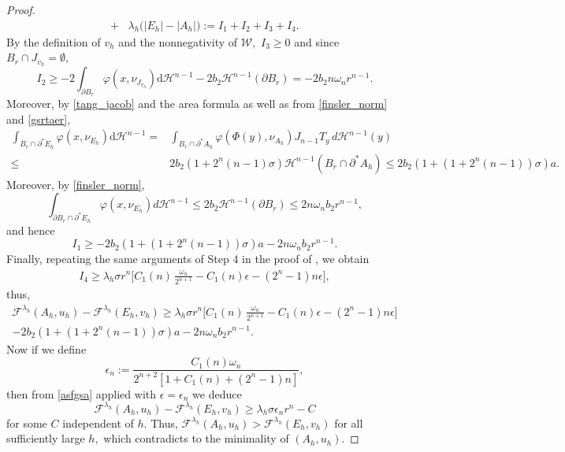 \documentclass[reqno]{amsart}
\numberwithin{equation}{section}
\theoremstyle{plain}
\theoremstyle{definition}
\newcommand{\cH}{\mathcal{H}}
\newcommand{\cF}{\mathcal{F}}
\newcommand{\cW}{\mathcal{W}}
\newcommand{\p}{\partial}
\newcommand{\bound}{b}
\renewcommand{\d}{\mathrm{d}}
\begin{document}
\begin{proof}
\begin{align}
+ & \lambda_h \Big(|E_h| - |A_h|\Big)
:= I_1 + I_2 + I_3+I_4. \label{saisnainsa}
\end{align}
By the definition of $v_h$ and the nonnegativity of $\cW,$ $I_3\ge0$  and since $B_r\cap J_{v_h}=\emptyset,$
$$
I_2\ge - 2\int_{\p B_r} \varphi(x,\nu_{J_{v_h}})\d\cH^{n-1} -2\bound_2\cH^{n-1}(\p B_r) = -2\bound_2 n\omega_n r^{n-1}.
$$
Moreover, by \eqref{tang_jacob} and the area formula as well as from \eqref{finsler_norm} and \eqref{gsrtaer},
%
\begin{align*}
\int_{B_r\cap \p^* E_h} \varphi(x,\nu_{E_h})\d\cH^{n-1} = &
\int_{B_r\cap \p^* A_h}  \varphi(\Phi(y),\nu_{A_h})J_{n-1} T_y\,d\cH^{n-1}(y)\\
\le & 2\bound_2(1+2^n(n-1)\sigma) \cH^{n-1}(B_r\cap \p^* A_h) 
  \le 2\bound_2(1+(1+2^n(n-1))\sigma)a.
\end{align*}
Moreover, by \eqref{finsler_norm},
$$
\int_{\p B_r\cap \p^* E_h} \varphi(x,\nu_{E_h})d\cH^{n-1} \le 2\bound_2\cH^{n-1}(\p B_r) \le 2n\omega_n \bound_2r^{n-1},
$$
and hence
$$
I_1\ge - 2\bound_2(1+(1+2^n(n-1))\sigma)a - 2n\omega_n \bound_2r^{n-1}.
$$
Finally, repeating the same arguments of Step 4  in the proof of \cite[Theorem 1.1]{EF:2011}, we obtain
\begin{align*}
I_4 \ge \lambda_h \sigma r^n \Big[C_1(n)\,\frac{\omega_n}{2^{n+1}} - C_1(n)\epsilon - (2^n-1)n\epsilon\Big],
\end{align*}
thus, 
\begin{multline}
\cF^{\lambda_h}(A_h,u_h) -  \cF^{\lambda_h}(E_h,v_h) \ge   \lambda_h \sigma r^n \Big[C_1(n)\,\frac{\omega_n}{2^{n+1}} - C_1(n)\epsilon - (2^n-1)n\epsilon\Big] \\
-  2\bound_2(1+(1+2^n(n-1))\sigma)a - 2n\omega_n \bound_2r^{n-1}.  \label{asfgsa}
\end{multline}
%
Now if we define 
$$
\epsilon_n:=\frac{C_1(n)\omega_n}{2^{n+2} [1+C_1(n) + (2^n-1)n]},
$$
then from \eqref{asfgsa} applied with $\epsilon=\epsilon_n$ we deduce 
\begin{equation*}
\cF^{\lambda_h}(A_h,u_h) -  \cF^{\lambda_h}(E_h,v_h) \ge \lambda_h \sigma \epsilon_n r^n - C  
\end{equation*}
for some $C$ independent of $h.$ Thus, $\cF^{\lambda_h}(A_h,u_h) >\cF^{\lambda_h}(E_h,v_h)$  for all sufficiently large $h,$   which contradicts to the minimality of $(A_h,u_h).$
\end{proof}
\end{document}
